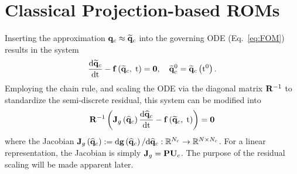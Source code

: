 \section{Classical Projection-based ROMs}\label{sec:classicROMs}

Inserting the approximation $\mathbf{q}_c \approx \mathbf{\widetilde{q}}_c$ into the governing ODE (Eq.~\ref{eq:FOM}) results in the system
%
\begin{equation}\label{eq:romFullODE}
    \frac{\text{d} \mathbf{\widetilde{q}}_c}{\text{d} \text{t}} - \mathbf{f} \left(\mathbf{\widetilde{q}}_c, \; \text{t}\right) = \mathbf{0}, \quad \mathbf{\widetilde{q}}_c^0 = \mathbf{\widetilde{q}}_c \left(\text{t}^0\right).
\end{equation}
%
Employing the chain rule, and scaling the ODE via the diagonal matrix $\resScaleInv$ to standardize the semi-discrete residual, this system can be modified into
%
\begin{equation}\label{eq:romFullODEMod}
    \resScaleInv \left( \jacobDecodeFunc{\consVecCoef} \ode{\consVecCoef}{\timeVar} - \rhsFunc{\consVecRom, \; \timeVar} \right) = \zeroVec
\end{equation}
%
where the Jacobian $\mathbf{J}_{g} \left(\mathbf{\widehat{q}}_{c}\right) := \text{d} \mathbf{g} \left(\mathbf{\widehat{q}}_{c}\right) / \text{d}\mathbf{\widehat{q}}_{c}: \mathbb{R}^{N_c} \rightarrow \mathbb{R}^{N \times N_c}$. For a linear representation, the Jacobian is simply $\jacobDecode = \consScale \consTrial$. The purpose of the residual scaling will be made apparent later.

